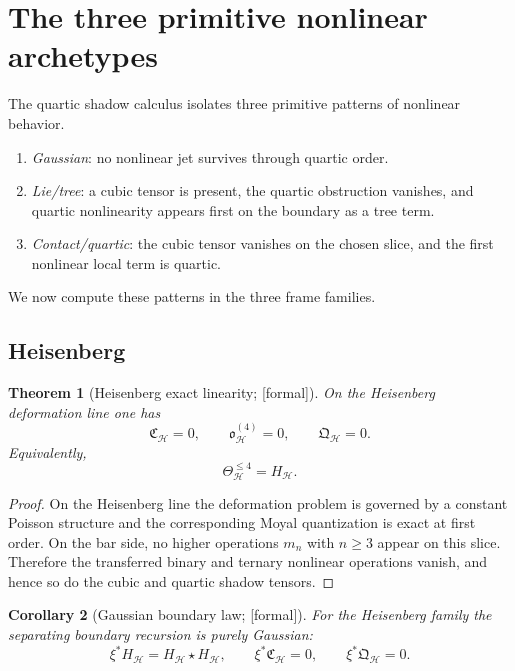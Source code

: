 \documentclass[11pt,oneside]{memoir}
\numberwithin{equation}{chapter}
\newtheorem{theorem}{Theorem}[chapter]
\newtheorem{corollary}[theorem]{Corollary}
\theoremstyle{definition}
\newcommand{\ClaimStatusProvedHere}{\textnormal{[formal]}}
\begin{document}
\section{The three primitive nonlinear archetypes}
\label{sec:nms-three-archetypes}

The quartic shadow calculus isolates three primitive patterns of nonlinear behavior.
\begin{enumerate}[label=\textup{(\roman*)}]
\item \emph{Gaussian}: no nonlinear jet survives through quartic order.
\item \emph{Lie/tree}: a cubic tensor is present, the quartic obstruction vanishes, and quartic nonlinearity appears first on the boundary as a tree term.
\item \emph{Contact/quartic}: the cubic tensor vanishes on the chosen slice, and the first nonlinear local term is quartic.
\end{enumerate}
We now compute these patterns in the three frame families.

\subsection{Heisenberg}
\label{subsec:nms-heisenberg}

\begin{theorem}[Heisenberg exact linearity; \ClaimStatusProvedHere]
\label{thm:nms-heisenberg-exact-linearity}
On the Heisenberg deformation line one has
\[
\mathfrak C_{\mathcal H}=0,
\qquad
\mathfrak o_{\mathcal H}^{(4)}=0,
\qquad
\mathfrak Q_{\mathcal H}=0.
\]
Equivalently,
\[
\Theta_{\mathcal H}^{\le 4}=H_{\mathcal H}.
\]
\end{theorem}

\begin{proof}
On the Heisenberg line the deformation problem is governed by a constant Poisson structure and the corresponding Moyal quantization is exact at first order.  On the bar side, no higher operations $m_n$ with $n\ge 3$ appear on this slice.  Therefore the transferred binary and ternary nonlinear operations vanish, and hence so do the cubic and quartic shadow tensors.\qedhere
\end{proof}

\begin{corollary}[Gaussian boundary law; \ClaimStatusProvedHere]
\label{cor:nms-heisenberg-gaussian-boundary}
For the Heisenberg family the separating boundary recursion is purely Gaussian:
\[
\xi^*H_{\mathcal H}=H_{\mathcal H}\star H_{\mathcal H},
\qquad
\xi^*\mathfrak C_{\mathcal H}=0,
\qquad
\xi^*\mathfrak Q_{\mathcal H}=0.
\]
\end{corollary}
\end{document}
